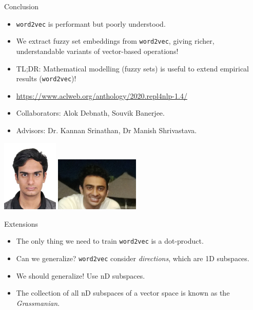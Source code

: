 \documentclass[8pt]{beamer}
\begin{document}
\begin{frame}{Conclusion}
  \begin{itemize}
    \item \texttt{word2vec} is performant but poorly understood.
    \item We extract fuzzy set embeddings from \texttt{word2vec}, giving richer, understandable variants of vector-based operations!
    \item TL;DR: Mathematical modelling (fuzzy sets) is useful to extend empirical results (\texttt{word2vec})!
    \item \url{https://www.aclweb.org/anthology/2020.repl4nlp-1.4/}
    \item Collaborators: Alok Debnath, Souvik Banerjee.
    \item Advisors: Dr. Kannan Srinathan, Dr Manish Shrivastava.
  \end{itemize}
  \includegraphics[width=0.2\textwidth]{./alok.jpeg}
  \includegraphics[width=0.3\textwidth]{./souvik.jpg}
\end{frame}


\begin{frame}{Extensions}
  \begin{itemize}
    \item The only thing we need to train \texttt{word2vec} is a dot-product. \pause
    \item Can we generalize? \texttt{word2vec} consider \emph{directions}, which are 1D subspaces. \pause
    \item We should generalize! Use nD subspaces. \pause
    \item The collection of all nD subspaces of a vector space is known as the \emph{Grassmanian}. \pause
  \end{itemize}
\end{frame}
\end{document}

